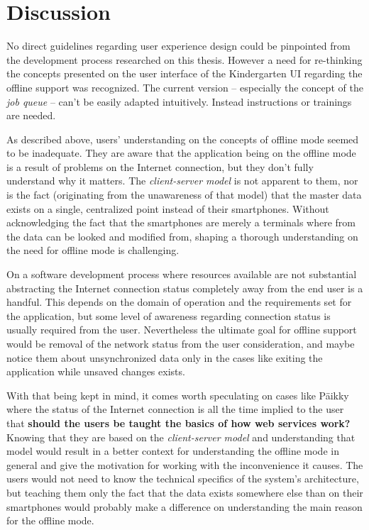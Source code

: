 \section{Discussion}



No direct guidelines regarding user experience design could be pinpointed from the development process researched on this thesis. However a need for re-thinking the concepts presented on the user interface of the Kindergarten UI regarding the offline support was recognized. The current version – especially the concept of the \textit{job queue} – can't be easily adapted intuitively. Instead instructions or trainings are needed.

As described above, users' understanding on the concepts of offline mode seemed to be inadequate. They are aware that the application being on the offline mode is a result of  problems on the Internet connection, but they don't fully understand why it matters. The \textit{client-server model} is not apparent to them, nor is the fact (originating from the unawareness of that model) that the master data exists on a single, centralized point instead of their smartphones. Without acknowledging the fact that the smartphones are merely a terminals where from the data can be looked and modified from, shaping a thorough understanding on the need for offline mode is challenging.

On a software development process where resources available are not substantial abstracting the Internet connection status completely away from the end user is a handful. This depends on the domain of operation and the requirements set for the application, but some level of awareness regarding connection status is usually required from the user. Nevertheless the ultimate goal for offline support would be removal of the network status from the user consideration, and maybe notice them about unsynchronized data only in the cases like exiting the application while unsaved changes exists.

With that being kept in mind, it comes worth speculating on cases like Päikky where the status of the Internet connection is all the time implied to the user that \textbf{should the users be taught the basics of how web services work?} Knowing that they are based on the \textit{client-server model} and understanding that model would result in a better context for understanding the offline mode in general and give the motivation for working with the inconvenience it causes. The users would not need to know the technical specifics of the system's architecture, but teaching them only the fact that the data exists somewhere else than on their smartphones would probably make a difference on understanding the main reason for the offline mode.

